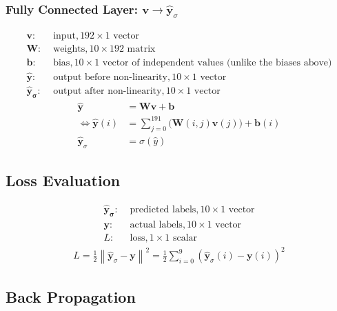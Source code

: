 \documentclass[12pt]{article}
\newcommand\norm[1]{\left\lVert#1\right\rVert}
\renewcommand{\vec}[1]{\mathbf{#1}}
\begin{document}
\subsubsection{Fully Connected Layer: $\vec{v} \rightarrow \vec{\hat{y}}_\sigma$}
\begin{align*}
    \vec{v}:& \text{ input}, 192 \times 1 \text{ vector}\\
    \bm{W}:& \text{ weights}, 10 \times 192 \text{ matrix}\\
    \vec{b}:& \text{ bias}, 10 \times 1 \text{ vector of independent values (unlike the biases above)}\\
    \vec{\hat{y}}:& \text{ output before non-linearity}, 10 \times 1 \text{ vector}\\
    \vec{\hat{y}_\sigma}:& \text{ output after non-linearity}, 10 \times 1 \text{ vector}
\end{align*}
\begin{align*}
    \vec{\hat{y}} &= \bm{W}\vec{v} + \vec{b}\\
    \Leftrightarrow
    \vec{\hat{y}}(i) &= \sum_{j = 0}^{191}\Big(\bm{W}(i, j)\vec{v}(j)\Big) + \vec{b}(i)\\
    \vec{\hat{y}}_\sigma &= \sigma(\hat{y})
\end{align*}

\subsection{Loss Evaluation}
\begin{align*}
    \vec{\hat{y}_\sigma}:& \text{ predicted labels}, 10 \times 1 \text{ vector}\\
    \vec{y}:& \text{ actual labels}, 10 \times 1 \text{ vector}\\
    L:& \text{ loss}, 1 \times 1 \text{ scalar}
\end{align*}
\begin{align*}
    L = \frac{1}{2} \norm{\vec{\hat{y}}_\sigma - \vec{y}}^2 =  \frac{1}{2}\sum_{i=0}^{9}(\vec{\hat{y}}_\sigma(i) - \vec{y}(i))^2
\end{align*}

\subsection{Back Propagation}
\end{document}
